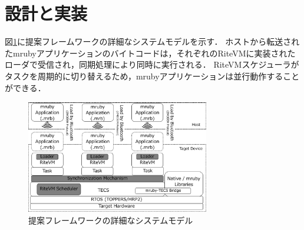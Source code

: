 \documentclass[submit,techrep]{ipsj}
\begin{document}
%
%
%
\section{設計と実装}
\label{sec:Design and Implementation}
図\ref{fig:system_model}に提案フレームワークの詳細なシステムモデルを示す．
ホストから転送されたmrubyアプリケーションのバイトコードは，それぞれのRiteVMに実装されたローダで受信され，同期処理により同時に実行される．
RiteVMスケジューラがタスクを周期的に切り替えるため，mrubyアプリケーションは並行動作することができる．
　
\begin{figure}[t]
    \centering
    \includegraphics[width=8cm,clip]{../EMSOFT2016/figure/system_model.pdf}
    \caption{提案フレームワークの詳細なシステムモデル}
    \label{fig:system_model}
\end{figure}
\end{document}
